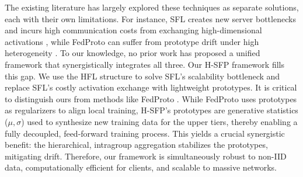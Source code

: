 The existing literature has largely explored these techniques as separate solutions, each with their own limitations. For instance, SFL creates new server bottlenecks \cite{10980018} and incurs high communication costs from exchanging high-dimensional activations \cite{11091500, zhang2025amperecommunicationefficienthighaccuracysplit}, while FedProto can suffer from prototype drift under high heterogeneity \cite{bensiah2025feddpa, zhang2020personalized}. To our knowledge, no prior work has proposed a unified framework that synergistically integrates all three. Our H-SFP framework fills this gap. We use the HFL structure to solve SFL's scalability bottleneck and replace SFL's costly activation exchange with lightweight prototypes. 
It is critical to distinguish ours from methods like FedProto \cite{tan2022fedproto}. While FedProto uses prototypes as regularizers to align local training, H-SFP's prototypes are generative statistics ($\mu, \sigma$) used to synthesize new training data for the upper tiers, thereby enabling a fully decoupled, feed-forward training process. This yields a crucial synergistic benefit: the hierarchical, intragroup aggregation stabilizes the prototypes, mitigating drift. Therefore, our framework is simultaneously robust to non-IID data, computationally efficient for clients, and scalable to massive networks.

